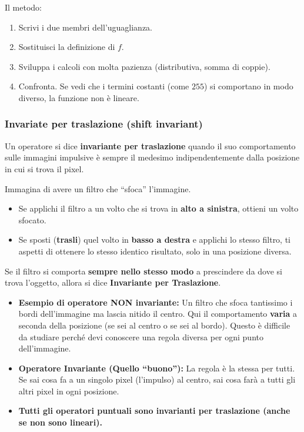 \documentclass[
]{article}
\providecommand{\tightlist}{%
  \setlength{\itemsep}{0pt}\setlength{\parskip}{0pt}}
\begin{document}
Il metodo:

\begin{enumerate}
\def\labelenumi{\arabic{enumi}.}
\tightlist
\item
  Scrivi i due membri dell'uguaglianza.
\item
  Sostituisci la definizione di \(f\).
\item
  Sviluppa i calcoli con molta pazienza (distributiva, somma di coppie).
\item
  Confronta. Se vedi che i termini costanti (come \(255\)) si comportano in modo diverso, la funzione non è lineare.
\end{enumerate}

\hypertarget{invariate-per-traslazione-shift-invariant}{%
\subsubsection{Invariate per traslazione (shift invariant)}\label{invariate-per-traslazione-shift-invariant}}

Un operatore si dice \textbf{invariante per traslazione} quando il suo comportamento sulle immagini impulsive è sempre il medesimo indipendentemente dalla posizione in cui si trova il pixel.

Immagina di avere un filtro che ``sfoca'' l'immagine.

\begin{itemize}
\tightlist
\item
  Se applichi il filtro a un volto che si trova in \textbf{alto a sinistra}, ottieni un volto sfocato.
\item
  Se sposti (\textbf{trasli}) quel volto in \textbf{basso a destra} e applichi lo stesso filtro, ti aspetti di ottenere lo stesso identico risultato, solo in una posizione diversa.
\end{itemize}

Se il filtro si comporta \textbf{sempre nello stesso modo} a prescindere da dove si trova l'oggetto, allora si dice \textbf{Invariante per Traslazione}.

\begin{itemize}
\tightlist
\item
  \textbf{Esempio di operatore NON invariante:} Un filtro che sfoca tantissimo i bordi dell'immagine ma lascia nitido il centro. Qui il comportamento \textbf{varia} a seconda della posizione (se sei al centro o se sei al bordo). Questo è difficile da studiare perché devi conoscere una regola diversa per ogni punto dell'immagine.
\item
  \textbf{Operatore Invariante (Quello ``buono''):} La regola è la stessa per tutti. Se sai cosa fa a un singolo pixel (l'impulso) al centro, sai cosa farà a tutti gli altri pixel in ogni posizione.
\item
  \textbf{Tutti gli operatori puntuali sono invarianti per traslazione (anche se non sono lineari).}
\end{itemize}
\end{document}
